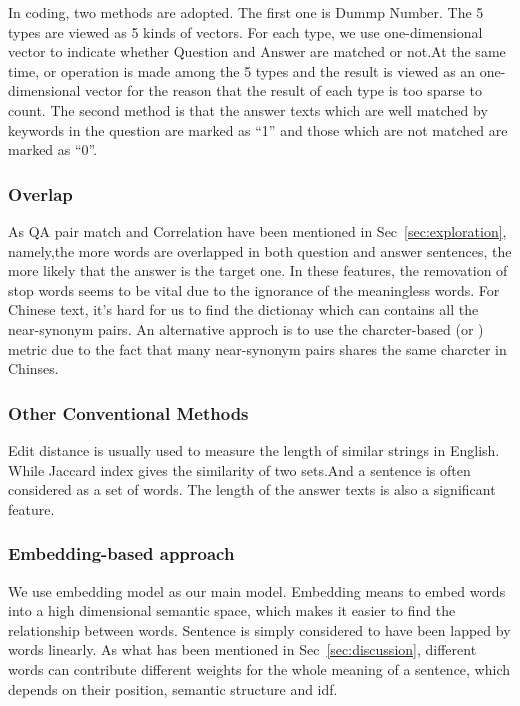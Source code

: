 \documentclass{llncs}
\begin{document}
In coding, two methods are adopted. The first one is Dummp Number. The 5 types are viewed as 5 kinds of vectors. For each type, we use one-dimensional vector to indicate whether Question and Answer are matched or not.At the same time, or operation is made among the 5 types and the result is viewed as an one-dimensional vector for the reason that the result of each type is too sparse to count. The second method is that the answer texts which are well matched by keywords in the question are marked as “1” and those which are not matched are marked as “0”.


\subsubsection{Overlap}
As QA pair match and Correlation have been mentioned in Sec~\ref{sec:exploration}, namely,the more words are overlapped in both question and answer sentences, the more likely that the answer is the target one.
In these features, the removation of stop words seems to be vital due to the ignorance of the meaningless words. For Chinese text, it's hard for us to find the dictionay which can contains all the near-synonym pairs. An alternative approch is to use the charcter-based (or ) metric due to the fact that many near-synonym pairs shares the same charcter in Chinses. 


\subsubsection{Other Conventional Methods}
Edit distance is usually used to measure the length of similar strings in English. While Jaccard index gives the similarity of two sets.And a sentence is often considered as a set of words.
The length of the answer texts is also a significant feature.


\subsubsection{Embedding-based approach}
\label{sec:embedding}
We use embedding model as our main model. Embedding means to embed words into a high dimensional semantic space, which makes it easier to find the relationship between words. Sentence is simply considered to have been lapped by words linearly. As what has been mentioned in Sec~\ref{sec:discussion}, different words can contribute different weights for the whole meaning of a sentence, which depends on their position, semantic structure and idf. 
\end{document}
